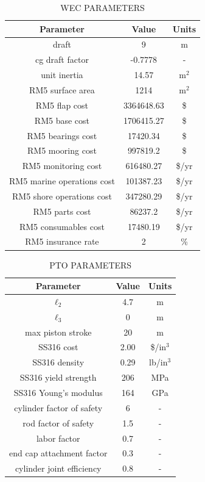 \documentclass[twocolumn,10pt]{asme2e}
\begin{document}
\begin{table}[h]
    \centering
    \caption{WEC PARAMETERS}
    \begin{tabular}{ccc}
        \hline
        \textbf{Parameter} & \textbf{Value} & \textbf{Units} \\
        \hline
        draft & 9 & m \\
        cg draft factor & -0.7778 & - \\
        unit inertia & 14.57 & m$^2$ \\
        RM5 surface area & 1214 \cite{rm5} & m$^2$ \\
        RM5 flap cost & 3364648.63 \cite{rm5} & \$ \\
        RM5 base cost & 1706415.27 \cite{rm5} & \$ \\
        RM5 bearings cost & 17420.34 \cite{rm5} & \$ \\
        RM5 mooring cost & 997819.2 \cite{rm5} & \$ \\
        RM5 monitoring cost & 616480.27 \cite{rm5} & \$/yr \\
        RM5 marine operations cost & 101387.23 \cite{rm5} & \$/yr \\
        RM5 shore operations cost & 347280.29 \cite{rm5} & \$/yr \\
        RM5 parts cost & 86237.2 \cite{rm5} & \$/yr \\
        RM5 consumables cost & 17480.19 \cite{rm5} & \$/yr \\
        RM5 insurance rate & 2 \cite{rm5} & \% \\
        \hline
    \end{tabular}
    \label{tab:paramswec}
\end{table}

\begin{table}[h]
    \centering
    \caption{PTO PARAMETERS}
    \begin{tabular}{ccc}
        \hline
        \textbf{Parameter} & \textbf{Value} & \textbf{Units} \\
        \hline
        $\ell_2$ & 4.7 & m \\
        $\ell_3$ & 0 & m \\
        max piston stroke & 20 & m \\
        SS316 cost & 2.00 \cite{316ss} & \$/in$^3$ \\
        SS316 density & 0.29 \cite{316ss} & lb/in$^3$ \\
        SS316 yield strength & 206 \cite{316ss} & MPa \\
        SS316 Young's modulus & 164 \cite{316ss} & GPa \\
        cylinder factor of safety & 6 & - \\
        rod factor of safety & 1.5 & - \\
        labor factor & 0.7 & - \\
        end cap attachment factor & 0.3 \cite{ASME_BPVC} & - \\
        cylinder joint efficiency & 0.8 \cite{ASME_BPVC} & - \\
        \hline
    \end{tabular}
    \label{tab:paramspto}
\end{table}
\end{document}
